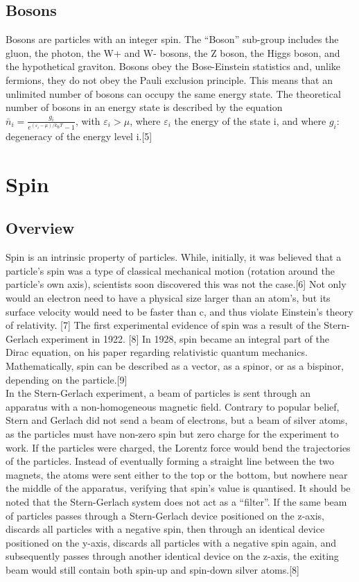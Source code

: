 \documentclass{article}
\begin{document}
\subsection{Bosons}
Bosons are particles with an integer spin. The “Boson” sub-group includes the gluon, the photon, the W+ and W- bosons, the Z boson, the Higgs boson, and the hypothetical graviton. Bosons obey the Bose-Einstein statistics and, unlike fermions, they do not obey the Pauli exclusion principle. This means that an unlimited number of bosons can occupy the same energy state. The theoretical number of bosons in an energy state is described by the equation ${\displaystyle {\bar {n}}_{i}={\frac {g_{i}}{e^{(\varepsilon _{i}-\mu ) / k_{\text{B}}T} - 1}}}$, with $\varepsilon _{i} > \mu$, where $\varepsilon _{i}$ the energy of the state i, and where $g_{i}$: degeneracy of the energy level i.[5]

\section{Spin}
\subsection{Overview}
Spin is an intrinsic property of particles. While, initially, it was believed that a particle’s spin was a type of classical mechanical motion (rotation around the particle’s own axis), scientists soon discovered this was not the case.[6] Not only would an electron need to have a physical size larger than an atom’s, but its surface velocity would need to be faster than c, and thus violate Einstein’s theory of relativity. [7] The first experimental evidence of spin was a result of the Stern-Gerlach experiment in 1922. [8] In 1928, spin became an integral part of the Dirac equation, on his paper regarding relativistic quantum mechanics. Mathematically, spin can be described as a vector, as a spinor, or as a bispinor, depending on the particle.[9]\\

In the Stern-Gerlach experiment, a beam of particles is sent through an apparatus with a non-homogeneous magnetic field. Contrary to popular belief, Stern and Gerlach did not send a beam of electrons, but a beam of silver atoms, as the particles must have non-zero spin but zero charge for the experiment to work. If the particles were charged, the Lorentz force would bend the trajectories of the particles. Instead of eventually forming a straight line between the two magnets, the atoms were sent either to the top or the bottom, but nowhere near the middle of the apparatus, verifying that spin’s value is quantised. It should be noted that the Stern-Gerlach system does not act as a “filter”. If the same beam of particles passes through a Stern-Gerlach device positioned on the z-axis, discards all particles with a negative spin, then through an identical device positioned on the y-axis, discards all particles with a negative spin again, and subsequently passes through another identical device on the z-axis, the exiting beam would still contain both spin-up and spin-down silver atoms.[8]
\end{document}

